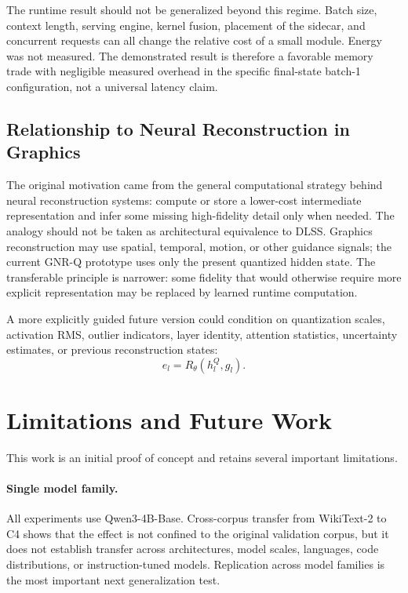 \documentclass[11pt]{article}
\begin{document}
The runtime result should not be generalized beyond this regime. Batch size, context length, serving engine, kernel fusion, placement of the sidecar, and concurrent requests can all change the relative cost of a small module. Energy was not measured. The demonstrated result is therefore a favorable memory trade with negligible measured overhead in the specific final-state batch-1 configuration, not a universal latency claim.

\subsection{Relationship to Neural Reconstruction in Graphics}

The original motivation came from the general computational strategy behind neural reconstruction systems: compute or store a lower-cost intermediate representation and infer some missing high-fidelity detail only when needed. The analogy should not be taken as architectural equivalence to DLSS. Graphics reconstruction may use spatial, temporal, motion, or other guidance signals; the current GNR-Q prototype uses only the present quantized hidden state. The transferable principle is narrower: some fidelity that would otherwise require more explicit representation may be replaced by learned runtime computation.

A more explicitly guided future version could condition on quantization scales, activation RMS, outlier indicators, layer identity, attention statistics, uncertainty estimates, or previous reconstruction states:
\begin{equation}
 \hat e_l = R_\theta(h_l^Q,g_l).
\end{equation}

\section{Limitations and Future Work}

This work is an initial proof of concept and retains several important limitations.

\paragraph{Single model family.}
All experiments use Qwen3-4B-Base. Cross-corpus transfer from WikiText-2 to C4 shows that the effect is not confined to the original validation corpus, but it does not establish transfer across architectures, model scales, languages, code distributions, or instruction-tuned models. Replication across model families is the most important next generalization test.
\end{document}
